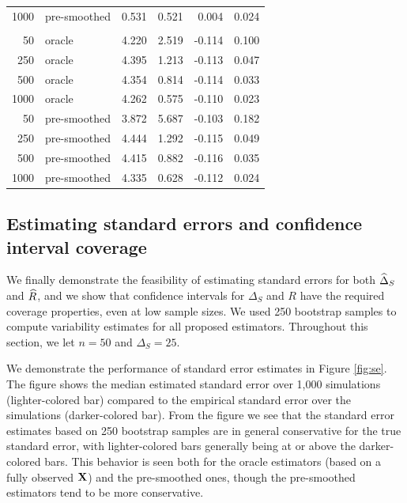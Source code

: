 \documentclass[useAMS,usenatbib,referee]{biom}
\begin{document}
\begin{table}[t]
\begin{tabular}{rlrrrr}
\hspace{1em}1000 & pre-smoothed & 0.531 & 0.521 & 0.004 & 0.024\\
\addlinespace[0.3em]
\multicolumn{6}{l}{\textbf{Linear-unsmoothed}}\\
\hspace{1em}50 & oracle & 4.220 & 2.519 & -0.114 & 0.100\\
\hspace{1em}250 & oracle & 4.395 & 1.213 & -0.113 & 0.047\\
\hspace{1em}500 & oracle & 4.354 & 0.814 & -0.114 & 0.033\\
\hspace{1em}1000 & oracle & 4.262 & 0.575 & -0.110 & 0.023\\
\hspace{1em}50 & pre-smoothed & 3.872 & 5.687 & -0.103 & 0.182\\
\hspace{1em}250 & pre-smoothed & 4.444 & 1.292 & -0.115 & 0.049\\
\hspace{1em}500 & pre-smoothed & 4.415 & 0.882 & -0.116 & 0.035\\
\hspace{1em}1000 & pre-smoothed & 4.335 & 0.628 & -0.112 & 0.024\\
\bottomrule
\end{tabular}
\end{table}

\subsection{Estimating standard errors and confidence interval coverage}

We finally demonstrate the feasibility of estimating standard errors for both ${\widehat\Delta}_S$ and ${\widehat R}$, and we show that confidence intervals for $\Delta_S$ and $R$ have the required coverage properties, even at low sample sizes. We used 250 bootstrap samples to compute variability estimates for all proposed estimators. Throughout this section, we let $n = 50$ and $\Delta_S = 25$. 

We demonstrate the performance of standard error estimates in Figure \ref{fig:se}. The figure shows the median estimated standard error over 1,000 simulations (lighter-colored bar) compared to the empirical standard error over the simulations (darker-colored bar). From the figure we see that the standard error estimates based on 250 bootstrap samples are in general conservative for the true standard error, with lighter-colored bars generally being at or above the darker-colored bars. This behavior is seen both for the oracle estimators (based on a fully observed ${\bf X}$) and the pre-smoothed ones, though the pre-smoothed estimators tend to be more conservative. 
\end{document}
